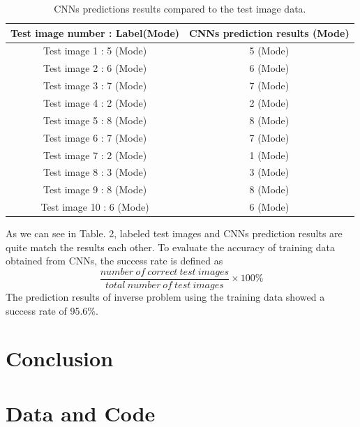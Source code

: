 \begin{table}[h!]
\centering
\caption{CNNs predictions results compared to the test image data.}
\label{tab:1}       
\begin{tabular}{c|c}
\hline
\hline
Test image number : Label(Mode) & CNNs prediction results (Mode) \\
\hline
Test image 1 : 5 (Mode) & 5 (Mode) \\
Test image 2 : 6 (Mode) & 6 (Mode) \\
Test image 3 : 7 (Mode) & 7 (Mode) \\
Test image 4 : 2 (Mode) & 2 (Mode) \\
Test image 5 : 8 (Mode) & 8 (Mode) \\
Test image 6 : 7 (Mode) & 7 (Mode) \\
Test image 7 : 2 (Mode) & 1 (Mode) \\
Test image 8 : 3 (Mode) & 3 (Mode) \\
Test image 9 : 8 (Mode) & 8 (Mode) \\
Test image 10 : 6 (Mode) & 6 (Mode) \\
\hline
\end{tabular}
\end{table}
As we can see in Table. 2, labeled test images and CNNs prediction results are quite match the results each other. To evaluate the accuracy of training data obtained from CNNs, the success rate is defined as
\begin{equation} 
\frac{number\ of\ correct\ test\ images}{total\ number\ of\ test\ images} \times 100\%
\end{equation}
The prediction results of inverse problem using the training data showed a success rate of 95.6\%.
\section{Conclusion}
\label{sec:5}

\section{Data and Code}
\label{sec:6}


%
%

